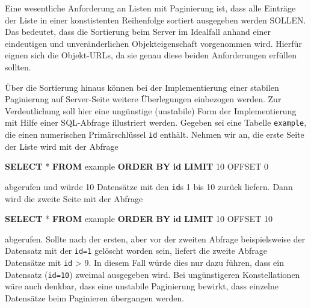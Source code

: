 \documentclass[,a4paper]{article}
\newenvironment{Shaded}{}{}
\newcommand{\KeywordTok}[1]{\textcolor[rgb]{0.00,0.44,0.13}{\textbf{{#1}}}}
\newcommand{\DecValTok}[1]{\textcolor[rgb]{0.25,0.63,0.44}{{#1}}}
\newcommand{\NormalTok}[1]{{#1}}
\begin{document}
Eine wesentliche Anforderung an Listen mit Paginierung ist, dass alle
Einträge der Liste in einer konstistenten Reihenfolge sortiert
ausgegeben werden SOLLEN. Das bedeutet, dass die Sortierung beim Server
im Idealfall anhand einer eindeutigen und unveränderlichen
Objekteigenschaft vorgenommen wird. Hierfür eignen sich die Objekt-URLs,
da sie genau diese beiden Anforderungen erfüllen sollten.

Über die Sortierung hinaus können bei der Implementierung einer stabilen
Paginierung auf Server-Seite weitere Überlegungen einbezogen werden. Zur
Verdeutlichung soll hier eine ungünstige (unstabile) Form der
Implementierung mit Hilfe einer SQL-Abfrage illustriert werden. Gegeben
sei eine Tabelle \texttt{example}, die einen numerischen Primärschlüssel
\texttt{id} enthält. Nehmen wir an, die erste Seite der Liste wird mit
der Abfrage

\begin{Shaded}
\begin{Highlighting}[]
\KeywordTok{SELECT} \NormalTok{* }\KeywordTok{FROM} \NormalTok{example }\KeywordTok{ORDER} \KeywordTok{BY} \KeywordTok{id} \KeywordTok{LIMIT} \DecValTok{10} \NormalTok{OFFSET }\DecValTok{0}
\end{Highlighting}
\end{Shaded}

abgerufen und würde 10 Datensätze mit den \texttt{id}s 1 bis 10 zurück
liefern. Dann wird die zweite Seite mit der Abfrage

\begin{Shaded}
\begin{Highlighting}[]
\KeywordTok{SELECT} \NormalTok{* }\KeywordTok{FROM} \NormalTok{example }\KeywordTok{ORDER} \KeywordTok{BY} \KeywordTok{id} \KeywordTok{LIMIT} \DecValTok{10} \NormalTok{OFFSET }\DecValTok{10}
\end{Highlighting}
\end{Shaded}

abgerufen. Sollte nach der ersten, aber vor der zweiten Abfrage
beispielsweise der Datensatz mit der \texttt{id=1} gelöscht worden sein,
liefert die zweite Abfrage Datensätze mit \texttt{id} \textgreater{} 9.
In diesem Fall würde dies nur dazu führen, dass ein Datensatz
(\texttt{id=10}) zweimal ausgegeben wird. Bei ungünstigeren
Konstellationen wäre auch denkbar, dass eine unstabile Paginierung
bewirkt, dass einzelne Datensätze beim Paginieren übergangen werden.
\end{document}

